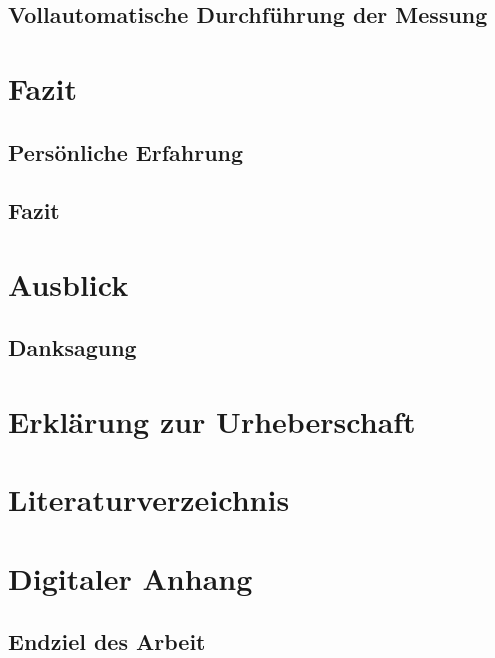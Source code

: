 \documentclass[a4paper,12pt]{article}
\begin{document}
\subsection{Vollautomatische Durchführung der Messung}


\newpage
\section{Fazit}
%

\subsection{Persönliche Erfahrung}


\subsection{Fazit}


\section{Ausblick}


\subsection*{Danksagung}


\newpage
%


\newpage
\section*{Erklärung zur Urheberschaft}


\newpage
\section*{Literaturverzeichnis}


\newpage
\listoffigures


\listoftables %
\newpage
\section*{Digitaler Anhang}


\subsection{Endziel des Arbeit}

\end{document}
